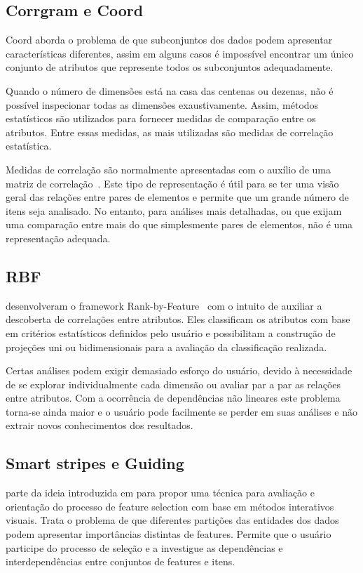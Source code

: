\subsection{Corrgram e  Coord}

Coord aborda o problema de que subconjuntos dos dados podem apresentar características diferentes, assim em alguns casos é impossível encontrar um único conjunto de atributos que represente todos os subconjuntos adequadamente. 

Quando o número de dimensões está na casa das centenas ou dezenas, não é possível inspecionar todas as dimensões exaustivamente. Assim, métodos estatísticos são utilizados para fornecer medidas de comparação entre os atributos. Entre essas medidas, as mais utilizadas são medidas de correlação estatística.

Medidas de correlação são normalmente apresentadas com o auxílio de uma matriz de correlação~\cite{Friendly2002}. Este tipo de representação é útil para se ter uma visão geral das relações entre pares de elementos e permite que um grande número de itens seja analisado. No entanto, para análises mais detalhadas, ou que exijam uma comparação entre mais do que simplesmente pares de elementos, não é uma representação adequada.

\subsection{RBF}

\citeauthor{Shneiderman2004} desenvolveram o framework Rank-by-Feature~\cite{Shneiderman2004} com o intuito de auxiliar a descoberta de correlações entre atributos. Eles classificam os atributos com base em critérios estatísticos definidos pelo usuário e possibilitam a construção de projeções uni ou bidimensionais para a avaliação da classificação realizada. 

Certas análises podem exigir demasiado esforço do usuário, devido à necessidade de se explorar individualmente cada dimensão ou avaliar par a par as relações entre atributos. Com a ocorrência de dependências não lineares este problema torna-se ainda maior e o usuário pode facilmente se perder em suas análises e não extrair novos conhecimentos dos resultados.

\subsection{Smart stripes e Guiding}

\cite{May2011} parte da ideia introduzida em \cite{May2011ss} para propor uma técnica para avaliação e orientação do processo de feature selection com base em métodos interativos visuais. Trata o problema de que diferentes partições das entidades dos dados podem apresentar  importâncias distintas de features. Permite que o usuário participe do processo de seleção e a investigue as dependências e interdependências entre conjuntos de features e itens.

